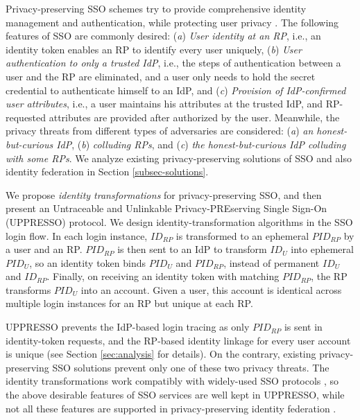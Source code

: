 Privacy-preserving SSO schemes try to provide comprehensive identity management and authentication,
    while protecting user privacy \cite{maler2008venn,NIST2017draft,BrowserID,SPRESSO}.
The following features of SSO are commonly desired:
(\emph{a}) \emph{User identity at an RP},
    i.e., an identity token enables an RP to identify every user uniquely,
(\emph{b}) \emph{User authentication to only a trusted IdP}, i.e.,
    the steps of authentication between a user and the RP are eliminated,
    and a user only needs to hold the secret credential to authenticate himself to an IdP,
and (\emph{c}) \emph{Provision of IdP-confirmed user attributes},
    i.e., a user maintains his attributes at the trusted IdP,
    and RP-requested attributes are provided %
            after authorized by the user.
Meanwhile,
    the privacy threats from different types of adversaries are considered:
    (\emph{a}) \emph{an honest-but-curious IdP},
    (\emph{b}) \emph{colluding RPs},
    and (\emph{c}) \emph{the honest-but-curious IdP colluding with some RPs}.
We analyze existing privacy-preserving solutions of SSO and also identity federation
in Section \ref{subsec-solutions}.


We propose {\em identity transformations} for privacy-preserving SSO,
and then present an Untraceable and Unlinkable Privacy-PREserving Single Sign-On (UPPRESSO) protocol.
We design identity-transformation algorithms in the SSO login flow.
In each login instance,
        $ID_{RP}$ is transformed to an ephemeral $PID_{RP}$  by a user and an RP.
$PID_{RP}$ is then sent to an IdP to transform $ID_U$ into ephemeral $PID_U$,
    so an identity token binds $PID_U$ and $PID_{RP}$, instead of permanent $ID_U$ and $ID_{RP}$.
Finally,
    on receiving an identity token with matching $PID_{RP}$,
        the RP transforms $PID_U$ into an account.
Given a user, this account is identical across multiple login instances for an RP
     but unique at each RP.

UPPRESSO prevents the IdP-based login tracing as only $PID_{RP}$ is sent in identity-token requests,
    and the RP-based identity linkage for every user account is unique
    (see Section \ref{sec:analysis} for details).
On the contrary,
     existing privacy-preserving SSO solutions \cite{BrowserID,SPRESSO,NIST2017draft,FirefoxAccount} prevent only one of these two privacy threats.
The identity transformations work compatibly with
    widely-used SSO protocols \cite{OpenIDConnect,rfc6749,SAML,NIST2017draft},
    so the above desirable features of SSO services are well kept in UPPRESSO,
    while not all these features are supported in privacy-preserving identity federation \cite{PseudoID,ELPASSO,UnlimitID,Opaak,uprov,hyperledge-idemix}.
%


